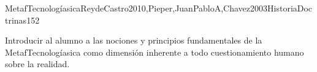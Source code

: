 \begin{syllabus}
\begin{unit}{MetafTecnologíasica}{ReydeCastro2010,Pieper,JuanPabloA,Chavez2003HistoriaDoctrinas}{15}{2}
\begin{learningoutcomes}
	\item Introducir al alumno a las nociones y principios fundamentales de la MetafTecnologíasica como dimensión inherente a todo cuestionamiento humano sobre la realidad.
\end{learningoutcomes}
\end{unit}



\begin{coursebibliography}
\end{coursebibliography}

\end{syllabus}
